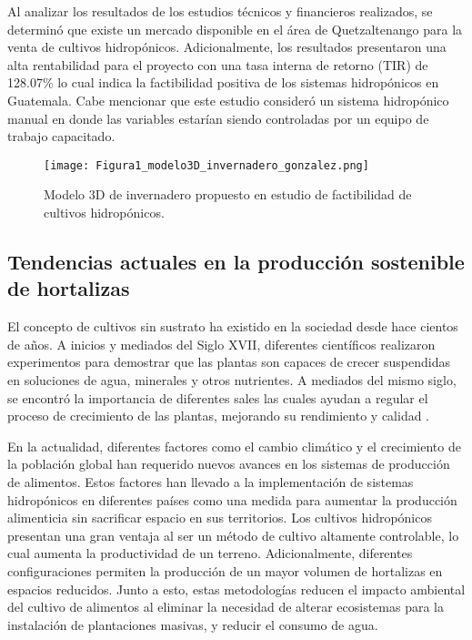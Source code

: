 Al analizar los resultados de los estudios técnicos y financieros realizados, se determinó que existe un mercado disponible en el área de Quetzaltenango para la venta de cultivos hidropónicos. Adicionalmente, los resultados presentaron una alta rentabilidad para el proyecto con una tasa interna de retorno (TIR) de 128.07\% lo cual indica la factibilidad positiva de los sistemas hidropónicos en Guatemala. Cabe mencionar que este estudio consideró un sistema hidropónico manual en donde las variables estarían siendo controladas por un equipo de trabajo capacitado.

\begin{figure}[H]
	\centering
	\texttt{[image: Figura1\_modelo3D\_invernadero\_gonzalez.png]}
	\caption{Modelo 3D de invernadero propuesto en estudio de factibilidad de cultivos hidropónicos.}
	\label{fig:mesh1}
\end{figure}

\subsection*{Tendencias actuales en la producción sostenible de hortalizas}
El concepto de cultivos sin sustrato ha existido en la sociedad desde hace cientos de años. A inicios y mediados del Siglo XVII, diferentes científicos realizaron experimentos para demostrar que las plantas son capaces de crecer suspendidas en soluciones de agua, minerales y otros nutrientes. A mediados del mismo siglo, se encontró la importancia de diferentes sales las cuales ayudan a regular el proceso de crecimiento de las plantas, mejorando su rendimiento y calidad \cite{rajaseger_hydroponics_2023}. 

En la actualidad, diferentes factores como el cambio climático y el crecimiento de la población global han requerido nuevos avances en los sistemas de producción de alimentos. Estos factores han llevado a la implementación de sistemas hidropónicos en diferentes países como una medida para aumentar la producción alimenticia sin sacrificar espacio en sus territorios. Los cultivos hidropónicos presentan una gran ventaja al ser un método de cultivo altamente controlable, lo cual aumenta la productividad de un terreno. Adicionalmente, diferentes configuraciones permiten la producción de un mayor volumen de hortalizas en espacios reducidos. Junto a esto, estas metodologías reducen el impacto ambiental del cultivo de alimentos al eliminar la necesidad de alterar ecosistemas para la instalación de plantaciones masivas, y reducir el consumo de agua.

